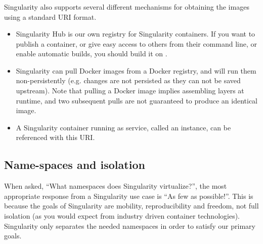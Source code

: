 \documentclass[letterpaper,10pt,english]{sphinxmanual}
\begin{document}
\subsubsection{}
\label{\detokenize{introduction:supported-uris}}
Singularity also supports several different mechanisms for obtaining the
images using a standard URI format.
\begin{itemize}
\item {} 
 Singularity Hub is our own registry for Singularity
containers. If you want to publish a container, or give easy access
to others from their command line, or enable automatic builds, you
should build it on .

\item {} 
 Singularity can pull Docker images from a Docker
registry, and will run them non-persistently (e.g. changes are not
persisted as they can not be saved upstream). Note that pulling a
Docker image implies assembling layers at runtime, and two subsequent
pulls are not guaranteed to produce an identical image.

\item {} 
 A Singularity container running as service, called an
instance, can be referenced with this URI.

\end{itemize}


\subsection{Name-spaces and isolation}
\label{\detokenize{introduction:name-spaces-and-isolation}}
When asked, “What namespaces does Singularity virtualize?”, the most
appropriate response from a Singularity use case is “As few as
possible!”. This is because the goals of Singularity are mobility,
reproducibility and freedom, not full isolation (as you would expect
from industry driven container technologies). Singularity only
separates the needed namespaces in order to satisfy our primary goals.
\end{document}
